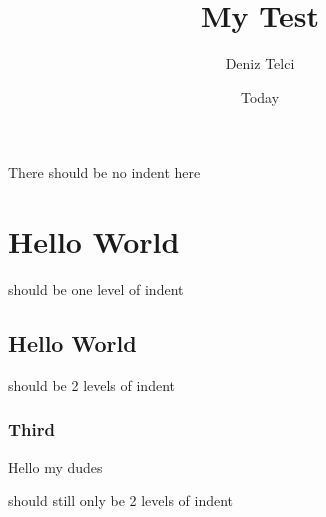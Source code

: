 \documentclass{article}
\title{My Test}
\author{Deniz Telci}
\date{Today}
\begin{document}
There should be no indent here
    \section{Hello World}
    should be one level of indent

        \subsection{Hello World}
        should be 2 levels of indent

        


    \subsubsection{Third}
    
    \begin{center}
        Hello my dudes
    \end{center}



    should still only be 2 levels of indent
\end{document}
